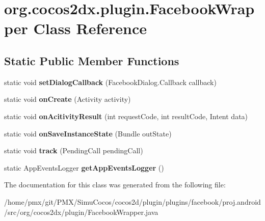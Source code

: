 \hypertarget{classorg_1_1cocos2dx_1_1plugin_1_1FacebookWrapper}{}\section{org.\+cocos2dx.\+plugin.\+Facebook\+Wrapper Class Reference}
\label{classorg_1_1cocos2dx_1_1plugin_1_1FacebookWrapper}
\subsection*{Static Public Member Functions}
\begin{DoxyCompactItemize}
\item 
\mbox{\label{classorg_1_1cocos2dx_1_1plugin_1_1FacebookWrapper_ab545dd5571e7d4b5cdb9986669401ccb}} 
static void {\bfseries set\+Dialog\+Callback} (Facebook\+Dialog.\+Callback callback)
\item 
\mbox{\label{classorg_1_1cocos2dx_1_1plugin_1_1FacebookWrapper_afa0f1ec0036d612d7725d269c9c1d438}} 
static void {\bfseries on\+Create} (Activity activity)
\item 
\mbox{\label{classorg_1_1cocos2dx_1_1plugin_1_1FacebookWrapper_a099cfe0fdf943d53eb2a43a67ea1cbda}} 
static void {\bfseries on\+Acitivity\+Result} (int request\+Code, int result\+Code, Intent data)
\item 
\mbox{\label{classorg_1_1cocos2dx_1_1plugin_1_1FacebookWrapper_a487680952993c0dd1d179aa685073884}} 
static void {\bfseries on\+Save\+Instance\+State} (Bundle out\+State)
\item 
\mbox{\label{classorg_1_1cocos2dx_1_1plugin_1_1FacebookWrapper_adcb417c5392283ab6b864f58e15f57de}} 
static void {\bfseries track} (Pending\+Call pending\+Call)
\item 
\mbox{\label{classorg_1_1cocos2dx_1_1plugin_1_1FacebookWrapper_a58ad315d5612e59c0beb1f61778c9a6f}} 
static App\+Events\+Logger {\bfseries get\+App\+Events\+Logger} ()
\end{DoxyCompactItemize}


The documentation for this class was generated from the following file\+:\begin{DoxyCompactItemize}
\item 
/home/pmx/git/\+P\+M\+X/\+Simu\+Cocos/cocos2d/plugin/plugins/facebook/proj.\+android/src/org/cocos2dx/plugin/Facebook\+Wrapper.\+java\end{DoxyCompactItemize}
